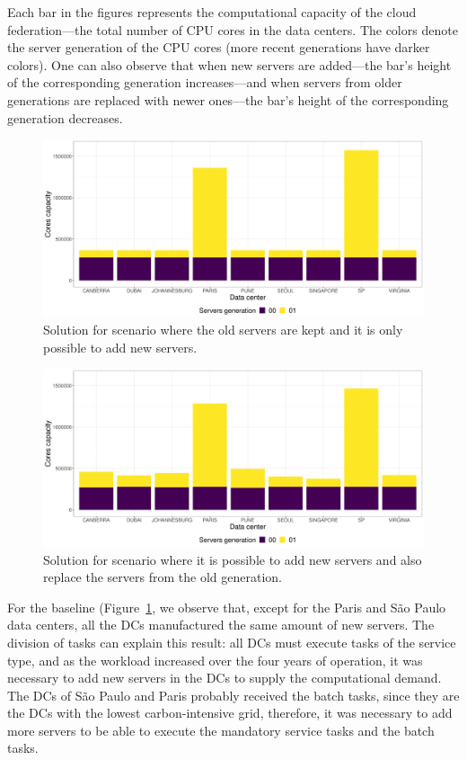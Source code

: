Each bar in the figures represents the computational capacity of the cloud federation---the total number of CPU cores in the data centers. The colors denote the server generation of the CPU cores  (more recent generations have darker colors). One can also observe that when new servers are added---the bar's height of the corresponding generation increases---and when servers from older generations are replaced with newer ones---the bar's height of the corresponding generation decreases.


\begin{figure}[h]
\centering 
  \includegraphics[width=\linewidth]{images/cloud_federation_only_add.png}
  \caption{Solution for scenario where the old servers are kept and it is only possible to add new servers.}
  \label{fig:dc_comparison_only_add}
\end{figure}

\begin{figure}[h]
\centering 
  \includegraphics[width=\linewidth]{images/cloud_federation_add_replace.png}
  \caption{Solution for scenario where it is possible to add new servers and also replace the servers from the old generation.}
  \label{fig:dc_comparison_add_replace}
\end{figure}


For the baseline (Figure~\ref{fig:dc_comparison_only_add}, we observe that, except for the Paris and São Paulo data centers, all the DCs manufactured the same amount of new servers. The division of tasks can explain this result: all DCs must execute tasks of the service type, and as the workload increased over the four years of operation, it was necessary to add new servers in the DCs to supply the computational demand. The DCs of São Paulo and Paris probably received the batch tasks, since they are the DCs with the lowest carbon-intensive grid, therefore, it was necessary to add more servers to be able to execute the mandatory service tasks and the batch tasks.


